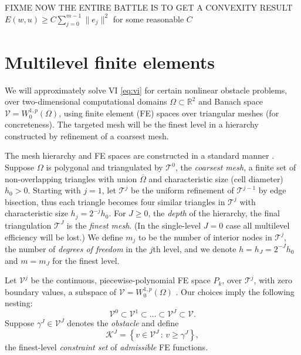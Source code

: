 \documentclass[letterpaper,final,12pt,reqno]{amsart}
\theoremstyle{cstyle}
\theoremstyle{cstyle*}
\theoremstyle{dstyle}
\numberwithin{equation}{section}
\numberwithin{figure}{section}
\numberwithin{table}{section}
\numberwithin{theorem}{section}
\newcommand{\RR}{\mathbb{R}}
\begin{document}
FIXME NOW THE ENTIRE BATTLE IS TO GET A CONVEXITY RESULT $E(w,u) \ge C \sum_{j=0}^{m-1} \|e_j\|^2$ for some reasonable $C$


\section{Multilevel finite elements} \label{sec:fe}

We will approximately solve VI \eqref{eq:vi} for certain nonlinear obstacle problems, over two-dimensional computational domains $\Omega \subset \RR^2$ and Banach space $\mathcal{V}=W_0^{1,p}(\Omega)$, using finite element (FE) spaces over triangular meshes (for concreteness).  The targeted mesh will be the finest level in a hierarchy constructed by refinement of a coarsest mesh.

The mesh hierarchy and FE spaces are constructed in a standard manner \cite{Elmanetal2014}.  Suppose $\Omega$ is polygonal and triangulated by $\mathcal{T}^0$, the \emph{coarsest mesh}, a finite set of non-overlapping triangles with union $\overline{\Omega}$ and characteristic size (cell diameter) $h_0>0$.  Starting with $j=1$, let $\mathcal{T}^j$ be the uniform refinement of $\mathcal{T}^{j-1}$ by edge bisection, thus each triangle becomes four similar triangles in $\mathcal{T}^j$ with characteristic size $h_j = 2^{-j} h_0$.  For $J\ge 0$, the \emph{depth} of the hierarchy, the final triangulation $\mathcal{T}^J$ is the \emph{finest mesh}.  (In the single-level $J=0$ case all multilevel efficiency will be lost.)  We define $m_j$ to be the number of interior nodes in $\mathcal{T}^j$, the number of \emph{degrees of freedom} in the $j$th level, and we denote $h=h_J=2^{-J} h_0$ and $m=m_J$ for the finest level.

Let $\mathcal{V}^j$ be the continuous, piecewise-polynomial FE space $P_k$, over $\mathcal{T}^j$, with zero boundary values, a subspace of $\mathcal{V}=W_0^{1,p}(\Omega)$ \cite{Elmanetal2014}.  Our choices imply the following nesting:
\begin{equation}
\mathcal{V}^0 \subset \mathcal{V}^1 \subset \dots \subset \mathcal{V}^J \subset \mathcal{V}.  \label{eq:fe:nestedspaces}
\end{equation}
Suppose $\gamma^J \in \mathcal{V}^J$ denotes the \emph{obstacle} and define
\begin{equation}
\mathcal{K}^J = \left\{v \in \mathcal{V}^J\,:\,v \ge \gamma^J\right\}, \label{eq:fineconstraintset}
\end{equation}
the finest-level \emph{constraint set} of \emph{admissible} FE functions.
\end{document}
